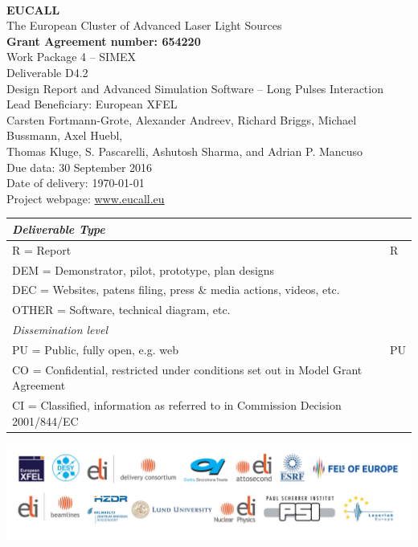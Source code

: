 \documentclass[10pt]{scrartcl}
\begin{document}
\makeatletter
\begin{titlepage}
\thispagestyle{scrheadings}
\begin{center}
$~$\\
\vspace{0cm}
{\Large\textbf{EUCALL}\\[2ex]
The European Cluster of Advanced Laser Light Sources}\\[4ex]
%
{\small\textbf{Grant Agreement number: 654220}}\\[8ex]
%
Work Package 4 -- SIMEX\\[4ex]
%
Deliverable D4.2\\
%
Design Report and Advanced Simulation Software -- Long Pulses
Interaction\\[5ex]
%
Lead Beneficiary: European XFEL\\[5ex]
%
Carsten Fortmann-Grote, Alexander Andreev, Richard Briggs, Michael Bussmann,
  Axel Huebl,\\ Thomas Kluge,
  S. Pascarelli, Ashutosh Sharma, and Adrian P. Mancuso\\[4ex]
%
Due data: 30 September 2016\\
Date of delivery: \today \\[4ex]
%
Project webpage: \url{www.eucall.eu}\\[6ex]
%
{%
\small
\begin{tabular}{|l|l|}
  \hline
  \multicolumn{2}{|l|}{ \textit{Deliverable Type} } \\
  \hline
  R = Report\hfill & R \\
  DEM = Demonstrator, pilot, prototype, plan designs & \\
  DEC = Websites, patens filing, press \& media actions, videos, etc. & \\
  OTHER = Software, technical diagram, etc. & \\
  \hline
  \multicolumn{2}{|l|}{\textit{Dissemination level}} \\
  \hline
  PU = Public, fully open, e.g. web & PU \\
  CO = Confidential, restricted under conditions set out in Model Grant
  Agreement\hspace*{17ex}\  & \\
  CI = Classified, information as referred to in Commission Decision 2001/844/EC
  & \\
  \hline
\end{tabular}
}

\end{center}
%
\vfill
\includegraphics[width=\textwidth]{./PartnerLogos.pdf}
\normalfont
\end{titlepage}
\makeatother
\end{document}
